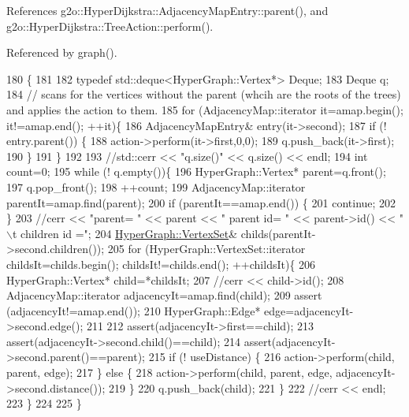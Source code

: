 References g2o\+::\+Hyper\+Dijkstra\+::\+Adjacency\+Map\+Entry\+::parent(), and g2o\+::\+Hyper\+Dijkstra\+::\+Tree\+Action\+::perform().



Referenced by graph().


\begin{DoxyCode}
180   \{
181     
182     \textcolor{keyword}{typedef} std::deque<HyperGraph::Vertex*> Deque;
183     Deque q;
184     \textcolor{comment}{// scans for the vertices without the parent (whcih are the roots of the trees) and applies the action
       to them.}
185     \textcolor{keywordflow}{for} (AdjacencyMap::iterator it=amap.begin(); it!=amap.end(); ++it)\{
186       AdjacencyMapEntry& entry(it->second);
187       \textcolor{keywordflow}{if} (! entry.parent()) \{
188         action->perform(it->first,0,0);
189         q.push\_back(it->first);
190       \}
191     \}
192 
193     \textcolor{comment}{//std::cerr << "q.size()" << q.size() << endl;}
194     \textcolor{keywordtype}{int} count=0;
195     \textcolor{keywordflow}{while} (! q.empty())\{
196       HyperGraph::Vertex* parent=q.front();
197       q.pop\_front();
198       ++count;
199       AdjacencyMap::iterator parentIt=amap.find(parent);
200       \textcolor{keywordflow}{if} (parentIt==amap.end()) \{
201         \textcolor{keywordflow}{continue};
202       \}
203       \textcolor{comment}{//cerr << "parent= " << parent << " parent id= " << parent->id() << "\(\backslash\)t children id =";}
204       \hyperlink{classg2o_1_1HyperGraph_a703938cdb4bb636860eed55a2489d70c}{HyperGraph::VertexSet}& childs(parentIt->second.children());
205       \textcolor{keywordflow}{for} (HyperGraph::VertexSet::iterator childsIt=childs.begin(); childsIt!=childs.end(); ++childsIt)\{
206         HyperGraph::Vertex* child=*childsIt;
207         \textcolor{comment}{//cerr << child->id();}
208         AdjacencyMap::iterator adjacencyIt=amap.find(child);
209         assert (adjacencyIt!=amap.end());
210         HyperGraph::Edge* edge=adjacencyIt->second.edge();  
211 
212         assert(adjacencyIt->first==child);
213         assert(adjacencyIt->second.child()==child);
214         assert(adjacencyIt->second.parent()==parent);
215         \textcolor{keywordflow}{if} (! useDistance) \{
216           action->perform(child, parent, edge);
217         \} \textcolor{keywordflow}{else} \{
218           action->perform(child, parent, edge, adjacencyIt->second.distance());
219         \}
220         q.push\_back(child);
221       \}
222       \textcolor{comment}{//cerr << endl;}
223     \}
224 
225   \}
\end{DoxyCode}
